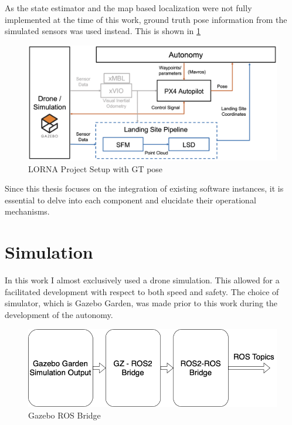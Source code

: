 As the state estimator and the map based localization were not fully implemented at the time of this work, ground truth pose information from the simulated sensors was used instead. This is shown in \cref{fig:lorna_setup_GT_pose}

\begin{figure}[ht]
    \centering
    \includegraphics[scale=0.18]{images/system_overview/setup_flowchart.png}
    \caption{LORNA Project Setup with GT pose}
    \label{fig:lorna_setup_GT_pose}
\end{figure}

Since this thesis focuses on the integration of existing software instances, it is essential to delve into each component and elucidate their operational mechanisms.

\clearpage %
\section{Simulation}

In this work I almost exclusively used a drone simulation. This allowed for a facilitated development with respect to both speed and safety. The choice of simulator, which is Gazebo Garden, was made prior to this work during the development of the autonomy.

\begin{figure}[ht!]
    \centering
    \includegraphics[scale=0.45]{images/system_overview/GZ_flowchart.png}
    \caption{Gazebo ROS Bridge}
\end{figure}


